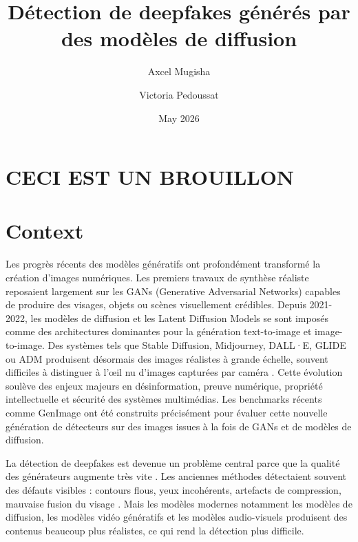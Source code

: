 \documentclass[runningheads]{llncs}
\title{Détection de deepfakes générés par des modèles de diffusion}
\author{Axcel Mugisha \and Victoria Pedoussat}
\institute{
IMT \\
\email{\{axcel.mugisha,victoria.pedoussat\}@utoulouse.fr}
}
\date{May 2026}
\begin{document}
\maketitle
\begin{abstract}
    
\end{abstract}
\section*{CECI EST UN BROUILLON}

\section{Context}
Les progrès récents des modèles génératifs ont profondément transformé la création d’images numériques. Les premiers travaux de synthèse réaliste reposaient largement sur les GANs  (Generative Adversarial Networks) \citep{goodfellow2020generative} capables de produire des visages, objets ou scènes visuellement crédibles. Depuis 2021-2022, les modèles de diffusion \citep{NEURIPS2020_4c5bcfec}et les Latent Diffusion Models \citep{rombach2022highresolutionimagesynthesislatent}se sont imposés comme des architectures dominantes pour la génération text-to-image et image-to-image. Des systèmes tels que Stable Diffusion, Midjourney, DALL·E, GLIDE ou ADM produisent désormais des images réalistes à grande échelle, souvent difficiles à distinguer à l’œil nu d’images capturées par caméra \citep{nichol2022glidephotorealisticimagegeneration,dhariwal2021diffusionmodelsbeatgans}. Cette évolution soulève des enjeux majeurs en désinformation, preuve numérique, propriété intellectuelle et sécurité des systèmes multimédias. Les benchmarks récents comme GenImage \citep{zhu2023genimage} ont été construits précisément pour évaluer cette nouvelle génération de détecteurs sur des images issues à la fois de GANs et de modèles de diffusion.

La détection de deepfakes est devenue un problème central parce que la qualité des générateurs augmente très vite \citep{mirsky2021creation,rossler2019faceforensics}. Les anciennes méthodes détectaient souvent des défauts visibles : contours flous, yeux incohérents, artefacts de compression, mauvaise fusion du visage \citep{li2018ictu,li2019warping,rossler2019faceforensics,li2020facexray,afchar2018mesonet} . Mais les modèles modernes notamment les modèles de diffusion, les modèles vidéo génératifs et les modèles audio-visuels produisent des contenus beaucoup plus réalistes, ce qui rend la détection plus difficile.
\end{document}
